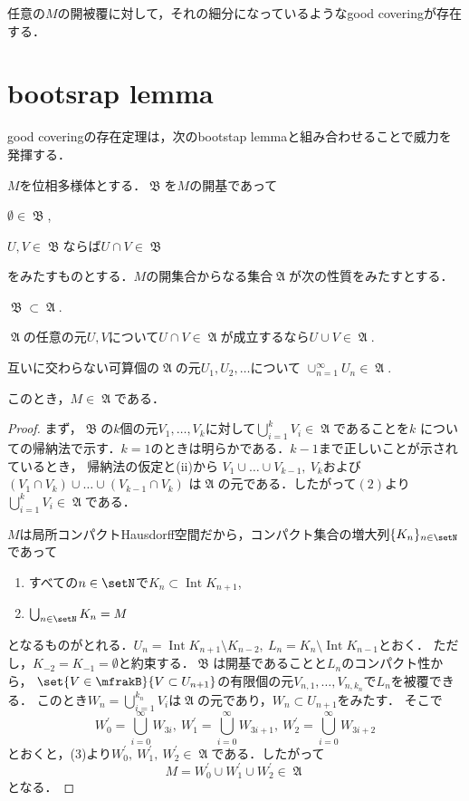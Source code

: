 \documentclass[uplatex]{jsarticle}
\DeclareMathOperator{\Int}{Int}
\begin{document}
\begin{corollary}
  任意の$M$の開被覆に対して，それの細分になっているようなgood coveringが存在する．
\end{corollary}

\section{bootsrap lemma}

good coveringの存在定理は，次のbootstap lemmaと組み合わせることで威力を発揮する．

\begin{theorem}
  $M$を位相多様体とする．$\mfrakB$を$M$の開基であって
  \begin{enumromanp}
    \item $\emptyset\in \mfrakB$,
    \item $U, V\in \mfrakB$ならば$U\cap V \in \mfrakB$
  \end{enumromanp}
  をみたすものとする．$M$の開集合からなる集合$\mfrakA$が次の性質をみたすとする．
  \begin{enumarabicp}
    \item $\mfrakB\subset \mfrakA$.
    \item $\mfrakA$の任意の元$U, V$について$U\cap V\in \mfrakA$が成立するなら$U\cup V\in \mfrakA$.
    \item 互いに交わらない可算個の$\mfrakA$の元$U_1, U_2, \dots$について
    $\cup_{n=1}^\infty U_n\in \mfrakA$.
  \end{enumarabicp}
  このとき，$M\in \mfrakA$である．
\end{theorem}

\begin{proof}
  まず，$\mfrakB$の$k$個の元$V_1, \dots, V_k$に対して$\bigcup_{i=1}^k V_i\in \mfrakA$であることを$k$
  についての帰納法で示す．$k=1$のときは明らかである．$k-1$まで正しいことが示されているとき，
  帰納法の仮定と(ii)から
  $V_1\cup\dots\cup V_{k-1},\ V_k$および$(V_1\cap V_k)\cup\dots \cup (V_{k-1}\cap V_k)$
  は$\mfrakA$の元である．したがって$(2)$より$\bigcup_{i=1}^k V_i\in\mfrakA$である．
  
  $M$は局所コンパクトHausdorff空間だから，コンパクト集合の増大列$\{K_n\}_{n\in \setN}$
  であって
  \begin{enumerate}
    \item すべての$n\in\setN$で$K_n\subset \Int K_{n+1}$,
    \item $\bigcup_{n\in\setN} K_n = M$
  \end{enumerate}
  となるものがとれる．$U_{n}=\Int K_{n+1}\setminus K_{n-2},\ L_n=K_n\setminus \Int K_{n-1}$とおく．
  ただし，$K_{-2}=K_{-1}=\emptyset$と約束する．$\mfrakB$は開基であることと$L_n$のコンパクト性から，
  $\set{V\in\mfrakB}{V\subset U_{n+1}}$の有限個の元$V_{n,1},\dots, V_{n,k_n}$で$L_n$を被覆できる．
  このとき$W_n=\bigcup_{i=1}^{k_n} V_i$は$\mfrakA$の元であり，$W_n\subset U_{n+1}$をみたす．
  そこで
    \[W^\prime_0=\bigcup_{i=0}^\infty W_{3i},\  W^\prime_1=\bigcup_{i=0}^\infty W_{3i+1},\ 
      W^\prime_2=\bigcup_{i=0}^\infty W_{3i+2}\]
  とおくと，(3)より$W^\prime_0,\ W^\prime_1,\ W^\prime_2\in\mfrakA$である．したがって
    \[M=W^\prime_0\cup W^\prime_1\cup W^\prime_2\in\mfrakA\]
  となる．
\end{proof}
\end{document}
